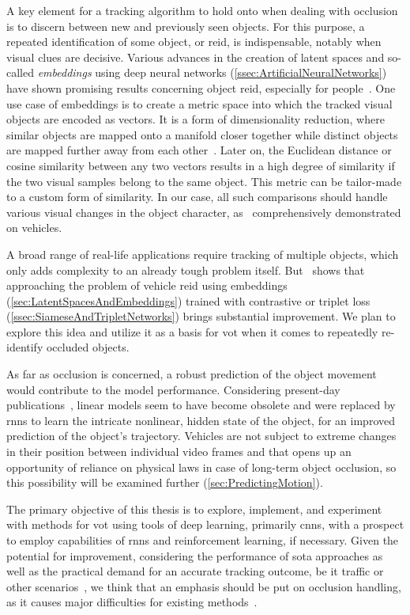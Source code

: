 A key element for a tracking algorithm to hold onto when dealing with occlusion is to discern between new and previously seen objects. For this purpose, a repeated identification of some object, or \gls{reid}, is indispensable, notably when visual clues are decisive. Various advances in the creation of latent spaces and so-called \emph{embeddings} using deep neural networks (\cref{ssec:ArtificialNeuralNetworks}) have shown promising results concerning object \gls{reid}, especially for people~\cite{Schroff2015, Taigman2014}. One use case of embeddings is to create a metric space into which the tracked visual objects are encoded as vectors. It is a form of dimensionality reduction, where similar objects are mapped onto a manifold closer together while distinct objects are mapped further away from each other~\cite{Hadsell2006}. Later on, the Euclidean distance or cosine similarity between any two vectors results in a high degree of similarity if the two visual samples belong to the same object. This metric can be tailor-made to a custom form of similarity. In our case, all such comparisons should handle various visual changes in the object character, as~\cite{Kuma2019} comprehensively demonstrated on vehicles.

A broad range of real-life applications require tracking of multiple objects, which only adds complexity to an already tough problem itself. But~\cite{Kuma2019} shows that approaching the problem of vehicle \gls{reid} using embeddings (\cref{sec:LatentSpacesAndEmbeddings}) trained with contrastive or triplet loss (\cref{ssec:SiameseAndTripletNetworks}) brings substantial improvement. We plan to explore this idea and utilize it as a basis for \gls{vot} when it comes to repeatedly re-identify occluded objects.

As far as occlusion is concerned, a robust prediction of the object movement would contribute to the model performance. Considering present-day publications~\cite{Tan2019}, linear models seem to have become obsolete and were replaced by \glspl{rnn} to learn the intricate nonlinear, hidden state of the object, for an improved prediction of the object’s trajectory. Vehicles are not subject to extreme changes in their position between individual video frames and that opens up an opportunity of reliance on physical laws in case of long-term object occlusion, so this possibility will be examined further (\cref{sec:PredictingMotion}).

The primary objective of this thesis is to explore, implement, and experiment with methods for \gls{vot} using tools of deep learning, primarily \glspl{cnn}, with a prospect to employ capabilities of \glspl{rnn} and reinforcement learning, if necessary. Given the potential for improvement, considering the performance of \gls{sota} approaches as well as the practical demand for an accurate tracking outcome, be it traffic or other scenarios~\cite{Tang2019}, we think that an emphasis should be put on occlusion handling, as it causes major difficulties for existing methods~\cite{Jiyan2007}.

